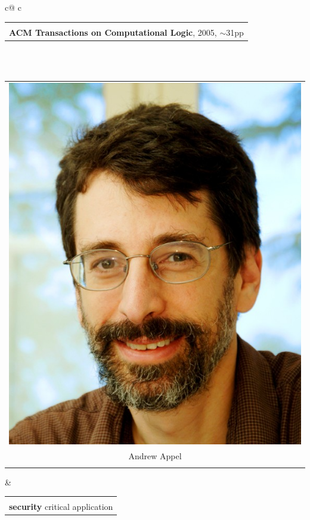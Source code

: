 \documentclass[dvipsnames,14pt,t]{beamer}
\begin{document}
\begin{frame}[c]
\begin{tabular}{c@ {\hspace{2mm}}c}
\begin{tabular}{p{6cm}}
\raggedright
{published a proof in\\ {\bf ACM Transactions on Computational Logic}, 2005,
$\sim$31pp}
\end{tabular}\\

\\[0mm]
  
\begin{tabular}{c}
\includegraphics[scale=0.36]{pics/appel.jpg}\\[-2mm] 
{\footnotesize Andrew Appel}\\[-2.5mm]
{\footnotesize}
\end{tabular} &

\begin{tabular}{p{6cm}}
\raggedright
{relied on their proof in a\\ {\bf security} critical application}
\end{tabular}
\end{tabular}

\end{frame}
\end{document}
